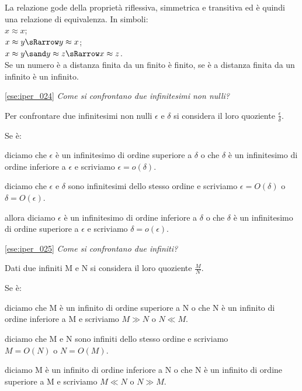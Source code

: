 La relazione gode della proprietà riflessiva, simmetrica e transitiva ed è 
quindi una relazione di equivalenza. In simboli:\\
\(x \approx x\);\\
\(x \approx y \sRarrow y \approx x\);\\
\(x \approx y \sand y \approx z \sRarrow x \approx z\).\\
Se un numero è a distanza finita da un finito è finito, se è a distanza finita 
da un infinito è un infinito.

% 

\ref{ese:iper_024} 
\emph{Come si confrontano due infinitesimi non nulli?}

Per confrontare due infinitesimi non nulli \(\epsilon\) e \(\delta\) si 
considera il loro quoziente \(\frac{\epsilon}{\delta}\). 

Se è:
\begin{description} [nosep]
 \item [infinitesimo] 
diciamo che \(\epsilon\) è un infinitesimo di ordine superiore a \(\delta\) o 
che \(\delta\) è un infinitesimo di ordine inferiore a 
\(\epsilon\) e 
scriviamo \(\epsilon = o(\delta)\).
 \item [finito non infinitesimo] 
diciamo che \(\epsilon\) e \(\delta\) sono infinitesimi dello stesso ordine e 
scriviamo \(\epsilon = O(\delta)\) o \(\delta = O(\epsilon)\).
 \item [infinito]
 allora diciamo \(\epsilon\) è un infinitesimo di ordine inferiore a \(\delta\) 
o che \(\delta\) è un infinitesimo di ordine superiore a \(\epsilon\) e 
scriviamo \(\delta = o(\epsilon)\).
\end{description}

\ref{ese:iper_025} 
\emph{Come si confrontano due infiniti?}

Dati due infiniti M e N si considera il loro quoziente \(\frac{M}{N}\). 

Se è:
\begin{description} [nosep]
 \item [infinito] 
diciamo che M è un infinito di ordine superiore a N o che N è un infinito di 
ordine inferiore a M e scriviamo \(M \gg N\) o \(N \ll M\).
 \item [finito non infinitesimo] 
diciamo che M e N sono infiniti dello stesso ordine e scriviamo \\
\(M = O(N)\) o \(N = O(M)\).
 \item [infinitesimo]
diciamo M è un infinito di ordine inferiore a N o che N è un 
infinito di ordine superiore a M e scriviamo \(M \ll N\) o \(N \gg M\).
\end{description}

